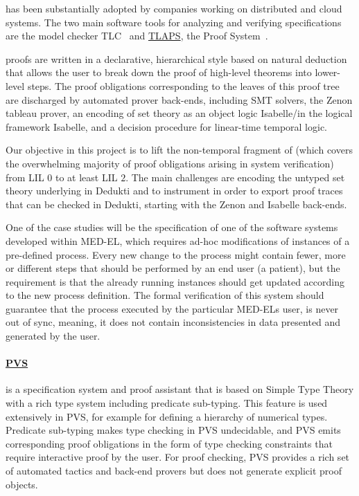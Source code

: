 \tlaplus\cite{lamport:specifying} has been substantially adopted by
companies working on distributed and cloud
systems\cite{newcombe:amazon-cacm}. The two main software tools for
analyzing and verifying \tlaplus specifications are the model checker
TLC~\cite{yu:model-checking} and
\href{https://tla.msr-inria.inria.fr/tlaps/content/Home.html}{TLAPS},
the \tlaplus Proof System~\cite{cousineau:tla-proofs}.

\tlaplus proofs are written in a declarative, hierarchical style based on
natural deduction that allows the user to break down the proof of high-level
theorems into lower-level steps. The proof obligations corresponding to the
leaves of this proof tree are discharged by automated prover back-ends,
including SMT solvers, the Zenon tableau prover, an encoding of \tlaplus set
theory as an object logic Isabelle/\tlaplus in the logical framework Isabelle,
and a decision procedure for linear-time temporal logic.

Our objective in this project is to lift the non-temporal fragment of
\tlaplus (which covers the overwhelming majority of proof obligations
arising in system verification) from LIL $0$ to at least LIL $2$. The main
challenges are encoding the untyped set theory underlying \tlaplus in
Dedukti and to instrument \tlaplus in order
to export proof traces that can be checked in Dedukti, starting with
the Zenon and Isabelle back-ends.

One of the case studies will be the specification of one of the software
systems developed within MED-EL, which requires ad-hoc modifications of
instances of a pre-defined process. Every new change to the process might
contain fewer, more or different steps that should be performed by an end user
(a patient), but the requirement is that the already running instances
should get updated according to the new process definition. The formal
verification of this system should guarantee that the process executed by the
particular MED-ELs user, is never out of sync, meaning, it does not contain
inconsistencies in data presented and generated by the user.

\paragraph*{\href{{https://pvs.csl.sri.com}}{PVS}}\cite{owre:pvs} is a specification
system and proof assistant that is based on Simple Type Theory with a rich type
system including predicate sub-typing. This feature is used extensively in PVS,
for example for defining a hierarchy of numerical types. Predicate sub-typing
makes type checking in PVS undecidable, and PVS emits corresponding proof
obligations in the form of type checking constraints that require
interactive proof by the user. For proof checking, PVS provides a rich set of
automated tactics and back-end provers but does not generate explicit proof
objects.

